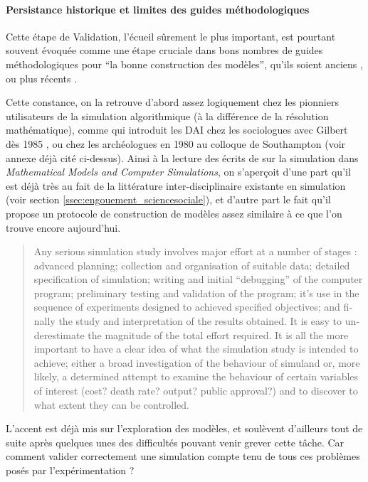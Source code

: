 \paragraph{Persistance historique et limites des guides méthodologiques}

Cette étape de Validation, l'écueil sûrement le plus important, est pourtant souvent évoquée comme une étape cruciale dans bons nombres de guides méthodologiques pour \enquote{la bonne construction des modèles}, qu'ils soient anciens \autocites[195]{Beshers1965}{Guetzkow1972, Dutton1971,Naylor1966, Naylor1967}, ou plus récents \autocite{Amblard2006, Gilbert2008}.

Cette constance, on la retrouve d'abord assez logiquement chez les pionniers utilisateurs de la simulation algorithmique (à la différence de la résolution mathématique), comme \textcite{Doran1975, Doran1986} qui introduit les DAI chez les sociologues avec Gilbert dès 1985 \autocite{Gilbert1985}, ou chez les archéologues en 1980 au colloque de Southampton \autocites{Doran1982, Renfrew1982} (voir annexe déjà cité ci-dessus). Ainsi à la lecture des écrits de \textcite[300-301]{Doran1975} sur la simulation dans \textit{Mathematical Models and Computer Simulations}, on s'aperçoit d'une part qu'il est déjà très au fait de la littérature inter-disciplinaire existante en simulation \autocite{Guetzkow1972} (voir section \ref{ssec:engouement_sciencesociale}), et d'autre part le fait qu'il propose un protocole de construction de modèles assez similaire à ce que l'on trouve encore aujourd'hui.

\foreignblockquote{english}[\cite{Guetzkow1972}]{Any serious simulation study involves major effort at a number of stages : advanced planning; collection and organisation of suitable data; detailed specification of simulation; writing and initial \enquote{debugging} of the computer program; preliminary testing and validation of the program; it's use in the sequence of experiments designed to achieved specified objectives; and finally the study and interpretation of the results obtained. It is easy to underestimate the magnitude of the total effort required. It is all the more important to have a clear idea of what the simulation study is intended to achieve; either a broad investigation of the behaviour of simuland  or, more likely, a determined attempt to examine the behaviour of certain variables of interest (cost? death rate? output? public approval?) and to discover to what extent they can be controlled.}

L'accent est déjà mis sur l'exploration des modèles, et \textcite[301]{Doran1975} soulèvent d'ailleurs tout de suite après quelques unes des difficultés pouvant venir grever cette tâche. Car comment valider correctement une simulation compte tenu de tous ces problèmes posés par l'expérimentation ?

